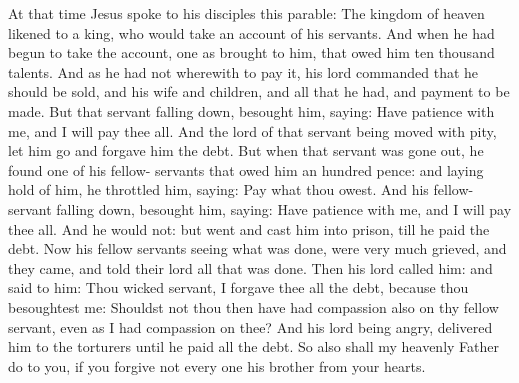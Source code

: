 \begin{multicols}{2}

At that time Jesus spoke to his disciples this parable:
The kingdom of heaven likened to a king, who would
take an account of his servants.
And when he had begun to take the account, one as brought to him,
that owed him ten thousand talents.
And as he had not wherewith to pay it, his lord commanded that he
should be sold, and his wife and children, and all that he had, and
payment to be made.
But that servant falling down, besought him, saying: Have
patience with me, and I will pay thee all.
And the lord of that servant being moved with pity, let him go
and forgave him the debt.
But when that servant was gone out, he found one of his fellow-
servants that owed him an hundred pence: and laying hold of him, he
throttled him, saying: Pay what thou owest.
And his fellow-servant falling down, besought him, saying: Have
patience with me, and I will pay thee all.
And he would not: but went and cast him into prison, till he paid
the debt.
Now his fellow servants seeing what was done, were very much
grieved, and they came, and told their lord all that was done.
Then his lord called him: and said to him: Thou wicked servant, I
forgave thee all the debt, because thou besoughtest me:
Shouldst not thou then have had compassion also on thy fellow
servant, even as I had compassion on thee?
And his lord being angry, delivered him to the torturers until he
paid all the debt.
So also shall my heavenly Father do to you, if you forgive not
every one his brother from your hearts.


\bigskip




\end{multicols}
